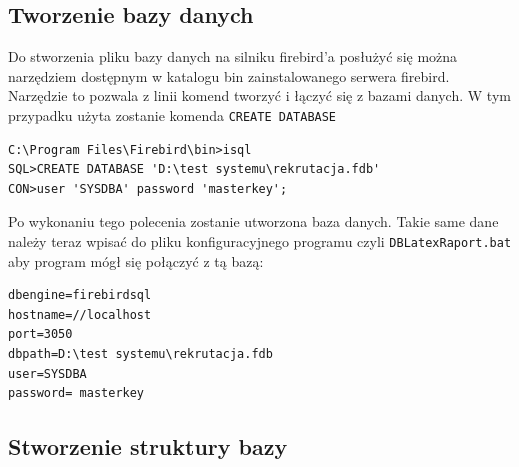\subsection{ Tworzenie bazy danych }

Do stworzenia pliku bazy danych na silniku firebird’a posłużyć się można narzędziem dostępnym w katalogu bin zainstalowanego serwera firebird.  Narzędzie to pozwala z linii komend tworzyć i łączyć się z bazami danych. W tym przypadku użyta zostanie komenda \texttt{CREATE DATABASE}
\begin{lstlisting}
C:\Program Files\Firebird\bin>isql
SQL>CREATE DATABASE 'D:\test systemu\rekrutacja.fdb'
CON>user 'SYSDBA' password 'masterkey';
\end{lstlisting}
Po wykonaniu tego polecenia zostanie utworzona baza danych. Takie same dane należy teraz wpisać do pliku konfiguracyjnego programu czyli \texttt{DBLatexRaport.bat} aby program mógł się połączyć z tą bazą:
\begin{lstlisting}
dbengine=firebirdsql
hostname=//localhost
port=3050
dbpath=D:\test systemu\rekrutacja.fdb
user=SYSDBA
password= masterkey
\end{lstlisting}
\subsection{ Stworzenie struktury bazy}


